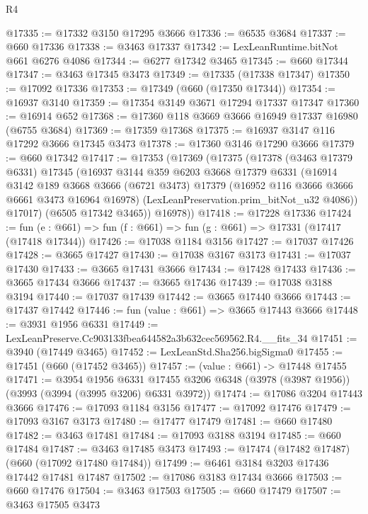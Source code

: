 \begin{lexlean}{R4}
\begin{coremodule}
@17335 := @17332 @3150 @17295 @3666
@17336 := @6535 @3684
@17337 := @660 @17336
@17338 := @3463 @17337
@17342 := LexLeanRuntime.bitNot @661 @6276 @4086
@17344 := @6277 @17342 @3465
@17345 := @660 @17344
@17347 := @3463 @17345 @3473
@17349 := @17335 (@17338 @17347)
@17350 := @17092 @17336
@17353 := @17349 (@660 (@17350 @17344))
@17354 := @16937 @3140
@17359 := @17354 @3149 @3671 @17294 @17337 @17347
@17360 := @16914 @652
@17368 := @17360 @118 @3669 @3666 @16949 @17337 @16980 (@6755 @3684)
@17369 := @17359 @17368
@17375 := @16937 @3147 @116 @17292 @3666 @17345 @3473
@17378 := @17360 @3146 @17290 @3666
@17379 := @660 @17342
@17417 := @17353
    (@17369
      (@17375
        (@17378
          (@3463 @17379 @6331)
          @17345
          (@16937
            @3144
            @359
            @6203
            @3668
            @17379
            @6331
            (@16914
              @3142
              @189
              @3668
              @3666
              (@6721 @3473)
              @17379
              (@16952 @116 @3666 @3666 @6661 @3473 @16964 @16978)
              (LexLeanPreservation.prim_bitNot_u32 @4086))
            @17017)
          (@6505 @17342 @3465))
        @16978))
@17418 := @17228 @17336
@17424 := fun (e : @661) => fun (f : @661) => fun (g : @661) => @17331 (@17417 (@17418 @17344))
@17426 := @17038 @1184 @3156
@17427 := @17037 @17426
@17428 := @3665 @17427
@17430 := @17038 @3167 @3173
@17431 := @17037 @17430
@17433 := @3665 @17431 @3666
@17434 := @17428 @17433
@17436 := @3665 @17434 @3666
@17437 := @3665 @17436
@17439 := @17038 @3188 @3194
@17440 := @17037 @17439
@17442 := @3665 @17440 @3666
@17443 := @17437 @17442
@17446 := fun (value : @661) => @3665 @17443 @3666
@17448 := @3931 @1956 @6331
@17449 := LexLeanPreserve.Cc903133fbea644582a3b632cec569562.R4.__fits_34
@17451 := @3940 (@17449 @3465)
@17452 := LexLeanStd.Sha256.bigSigma0
@17455 := @17451 (@660 (@17452 @3465))
@17457 := (value : @661) -> @17448 @17455
@17471 := @3954
    @1956
    @6331
    @17455
    @3206
    @6348
    (@3978 (@3987 @1956))
    (@3993 (@3994 (@3995 @3206) @6331 @3972))
@17474 := @17086 @3204 @17443 @3666
@17476 := @17093 @1184 @3156
@17477 := @17092 @17476
@17479 := @17093 @3167 @3173
@17480 := @17477 @17479
@17481 := @660 @17480
@17482 := @3463 @17481
@17484 := @17093 @3188 @3194
@17485 := @660 @17484
@17487 := @3463 @17485 @3473
@17493 := @17474 (@17482 @17487) (@660 (@17092 @17480 @17484))
@17499 := @6461 @3184 @3203 @17436 @17442 @17481 @17487
@17502 := @17086 @3183 @17434 @3666
@17503 := @660 @17476
@17504 := @3463 @17503
@17505 := @660 @17479
@17507 := @3463 @17505 @3473

\end{coremodule}
\end{lexlean}
